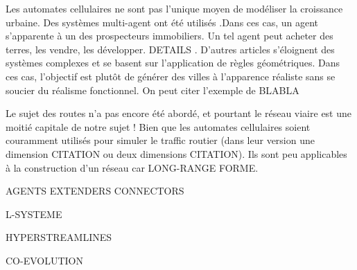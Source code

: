 \documentclass[10pt]{article}
\begin{document}
\begin{multicols}{2}
Les automates cellulaires ne sont pas l'unique moyen de modéliser la
croissance urbaine. Des systèmes multi-agent ont été utilisés
\cite{Lechnera,Lechner2004}.Dans ces cas, un agent s'apparente à un
des prospecteurs immobiliers. Un tel agent peut acheter des terres,
les vendre, les développer. DETAILS . D'autres articles s'éloignent
des systèmes complexes et se basent sur l'application de règles
géométriques. Dans ces cas, l'objectif est plutôt de générer des
villes à l'apparence réaliste sans se soucier du réalisme
fonctionnel. On peut citer l'exemple de BLABLA

Le sujet des routes n'a pas encore été abordé, et pourtant le réseau
viaire est une moitié capitale de notre sujet ! Bien que les automates
cellulaires soient couramment utilisés pour simuler le traffic routier
(dans leur version une dimension CITATION ou deux dimensions
CITATION). Ils sont peu applicables à la construction d'un réseau car
LONG-RANGE FORME.

AGENTS EXTENDERS CONNECTORS

L-SYSTEME

HYPERSTREAMLINES

CO-EVOLUTION

\end{multicols}
\end{document}

